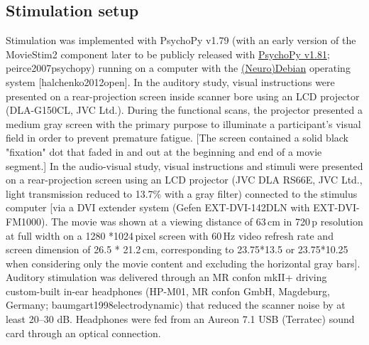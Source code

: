 \documentclass[english]{article}
\begin{document}
\subsection{Stimulation setup}
Stimulation was implemented with PsychoPy v1.79 (with an early version of the MovieStim2 component later to be publicly released with \href{http://www.psychopy.org}{PsychoPy v1.81}; {peirce2007psychopy}) running on a computer with the \href{http://neuro.debian.net}{(Neuro)Debian} operating system [halchenko2012open]. 
In the auditory study, visual instructions were presented on a rear-projection screen inside scanner bore using an LCD projector (DLA-G150CL, JVC Ltd.). During the functional scans, the projector presented a medium gray screen with the primary purpose to illuminate a participant’s visual field in order to prevent premature fatigue. [The screen contained a solid black "fixation" dot that faded in and out at the beginning and end of a movie segment.]
In the audio-visual study, visual instructions and stimuli were presented on a rear-projection screen using an LCD projector (JVC DLA RS66E, JVC Ltd., light transmission reduced to 13.7\% with a gray filter) connected to the stimulus computer [via a DVI extender system (Gefen EXT-DVI-142DLN with EXT-DVI-FM1000). The movie was shown at a viewing distance of 63\,cm in 720\,p resolution at full width on a 1280 *1024\,pixel screen with 60\,Hz video refresh rate and screen dimension of 26.5 * 21.2\,cm, corresponding to 23.75*13.5 or 23.75*10.25 when considering only the movie content and excluding the horizontal gray bars].
Auditory stimulation was delivered through an MR confon mkII+ driving custom-built in-ear headphones (HP-M01, MR confon GmbH, Magdeburg, Germany; {baumgart1998electrodynamic}) that reduced the scanner noise by at least 20–30 dB. Headphones were  fed from an Aureon 7.1 USB (Terratec) sound card through an optical connection.
\end{document}
